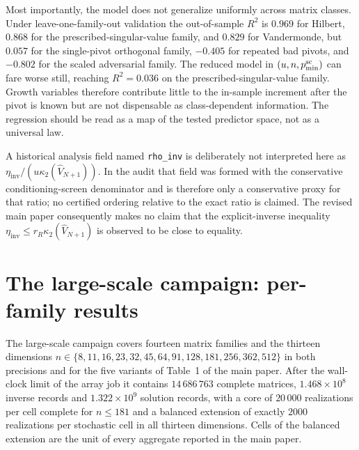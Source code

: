 \documentclass[supplement,review,onefignum,onetabnum]{siamart251216}
\begin{document}
Most importantly, the model does not generalize uniformly across matrix classes. Under
leave-one-family-out validation the out-of-sample $R^2$ is $0.969$ for Hilbert, $0.868$ for the
prescribed-singular-value family, and $0.829$ for Vandermonde, but $0.057$ for the single-pivot
orthogonal family, $-0.405$ for repeated bad pivots, and $-0.802$ for the scaled adversarial family.
The reduced model in $(u,n,p^{\rm sc}_{\min})$ can fare worse still, reaching $R^2=0.036$ on the
prescribed-singular-value family. Growth variables therefore contribute little to the in-sample
increment after the pivot is known but are not dispensable as class-dependent information. The
regression should be read as a map of the tested predictor space, not as a universal law.

A historical analysis field named \texttt{rho\_inv} is deliberately not interpreted here as
$\eta_{\mathrm{inv}}/(u\kappa_2(\widehat V_{N+1}))$. In the audit that field was formed with the
conservative conditioning-screen denominator and is therefore only a conservative proxy for that
ratio; no certified ordering relative to the exact ratio is claimed. The revised main paper consequently makes no claim that the explicit-inverse inequality
$\eta_{\mathrm{inv}}\le r_R\kappa_2(\widehat V_{N+1})$ is observed to be close to equality.

\section{The large-scale campaign: per-family results}
\label{sm:large}

The large-scale campaign covers fourteen matrix families and the thirteen dimensions
$n\in\{8,11,16,23,32,45,64,91,128,181,256,362,512\}$ in both precisions and for the five
variants of Table~1 of the main paper. After the wall-clock limit of the array job it
contains $14\,686\,763$ complete matrices, $1.468\times10^{8}$ inverse records and
$1.322\times10^{9}$ solution records, with a core of $20\,000$ realizations per cell complete for
$n\le181$ and a balanced extension of exactly $2000$ realizations per stochastic cell in all
thirteen dimensions. Cells of the balanced extension are the unit of every aggregate reported in
the main paper.
\end{document}

